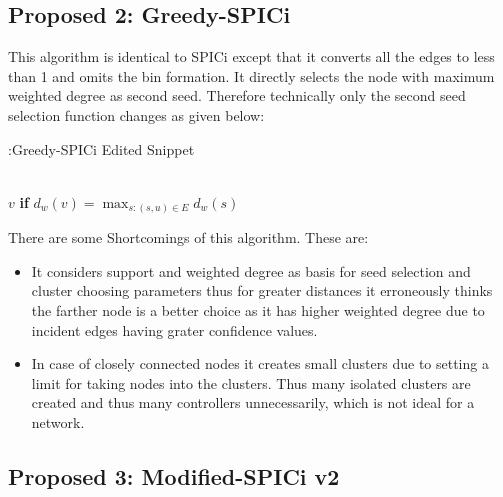 \documentclass[8pt]{extarticle}
\begin{document}
	\subsection{Proposed 2: Greedy-SPICi}
	
	This algorithm is identical to SPICi except that it converts all the edges to less than 1 and omits the bin formation. It directly selects the node with maximum weighted degree as second seed. Therefore technically only the second seed selection function changes as given below:
	\begin{algorithm}
		\caption{:Greedy-SPICi Edited Snippet}\label{euclid}
		\begin{algorithmic}[1]
			 \\
			\Return $v$ \textbf{if} $d_w(v)=\max_{s:(s,u)\in E}{d_w(s)}$
			\EndProcedure
		\end{algorithmic}
	\end{algorithm}

	There are some Shortcomings of this algorithm. These are:
	\begin{itemize}
		\item It considers support and weighted degree as basis for seed selection and cluster choosing parameters thus for greater distances it erroneously thinks the farther node is a better choice as it has higher weighted degree due to incident edges having grater confidence values.
		\item In case of closely connected nodes it creates small clusters due to setting a limit for taking nodes into the clusters. Thus many isolated clusters are created and thus many controllers unnecessarily, which is not ideal for a network.
	\end{itemize}
	\subsection{Proposed 3: Modified-SPICi v2}
	
\end{document}
